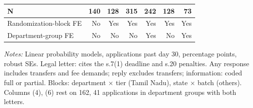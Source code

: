 \begin{table}[!htbp]
\begin{threeparttable}
\begin{tabular}{lrrrrrr}
N & 140 & 128 & 315 & 242 & 128 & 73 \\
\midrule
Randomization-block FE & No & Yes & Yes & Yes & Yes & Yes \\
Department-group FE & No & No & No & Yes & No & Yes \\
\bottomrule
\end{tabular}
\begin{tablenotes}[flushleft]\footnotesize
\item \textit{Notes:} Linear probability models, applications past day 30, percentage points, robust SEs. Legal letter: cites the s.7(1) deadline and s.20 penalties. Any response includes transfers and fee demands; reply excludes transfers; information: coded full or partial. Blocks: department $\times$ tier (Tamil Nadu), state $\times$ batch (others). Columns (4), (6) rest on 162, 41 applications in department groups with both letters.
\end{tablenotes}
\end{threeparttable}
\end{table}
